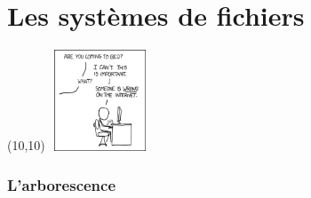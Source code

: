 %
%
%

\part{Les systèmes de fichiers}

{
\begin{frame}[plain]
  \partpage
  \begin{textblock}{10}(10,10)
    \includegraphics[height=30mm,width=30mm]{pics/duty_calls}
  \end{textblock}
\end{frame}
}

\begin{frame}
  \tableofcontents
\end{frame}

\section{L'arborescence}

